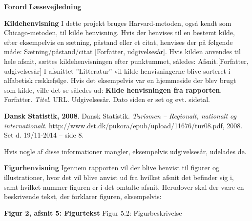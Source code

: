 {\Huge\textbf{Forord}}
 \newline
\newline
\newline
{\Huge\textbf{Læsevejledning}}

{\Large\textbf{Kildehenvisning}}\newline
I dette projekt bruges Harvard-metoden, også kendt som Chicago-metoden, til kilde henvisning. Hvis der henvises til en bestemt kilde, efter eksempelvis en sætning, påstand eller et citat, henvises der på følgende måde: Sætning/påstand/citat [Forfatter, udgivelsesår].\newline
Hvis kilden anvendes til hele afsnit, sættes kildehenvisningen efter punktummet, således: Afsnit.[Forfatter, udgivelsesår]\newline
I afsnittet ”Litteratur” vil kilde henvisningerne blive sorteret i alfabetisk rækkefølge. Hvis det eksempelvis var en hjemmeside der blev brugt som kilde, ville det se således ud: \newline
\textbf{Kilde henvisningen fra rapporten}. Forfatter. \textit{Titel}. URL. Udgivelsesår. Dato siden er set og evt. sidetal.

\textbf{Dansk Statistik, 2008}. Dansk Statistik. \textit{Turismen – Regionalt, nationalt og internationalt}. http://www.dst.dk/pukora/epub/upload/11676/tur08.pdf, 2008. Set d. 19/11-2014 – side 8.

Hvis nogle af disse informationer mangler, eksempelvis udgivelsesår, udelades de.

{\Large\textbf{Figurhenvisning}} \newline
Igennem rapporten vil der blive henvist til figurer og illustrationer, hvor det vil blive anvist ud fra hvilket afsnit det befinder sig i, samt hvilket nummer figuren er i det omtalte afsnit. Herudover skal der være en beskrivende tekst, der forklarer figuren, eksempelvis:
\begin{flushleft}
	{\LARGE\textbf{Figur 2, afsnit 5: Figurtekst}}\newline
	Figur 5.2: Figurbeskrivelse
\end{flushleft}
